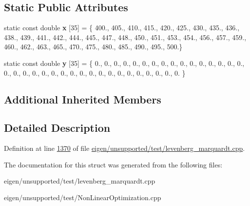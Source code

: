 \subsection*{Static Public Attributes}
\begin{DoxyCompactItemize}
\item 
\mbox{\label{structeckerle4__functor_ad42bef72c75b2b8e2c8e2c0f77bd54ed}} 
static const double {\bfseries x} \mbox{[}35\mbox{]} = \{ 400., 405., 410., 415., 420., 425., 430., 435., 436., 438., 439., 441., 442., 444., 445., 447., 448., 450., 451., 453., 454., 456., 457., 459., 460., 462., 463., 465., 470., 475., 480., 485., 490., 495., 500.\}
\item 
\mbox{\label{structeckerle4__functor_ac3b38ab6cd0b6aa294acd137e1f564df}} 
static const double {\bfseries y} \mbox{[}35\mbox{]} = \{ 0., 0., 0., 0., 0., 0., 0., 0., 0., 0., 0., 0., 0., 0., 0., 0., 0., 0., 0., 0., 0., 0., 0., 0., 0., 0., 0., 0., 0., 0., 0., 0., 0., 0., 0. \}
\end{DoxyCompactItemize}
\subsection*{Additional Inherited Members}


\subsection{Detailed Description}


Definition at line \hyperlink{eigen_2unsupported_2test_2levenberg__marquardt_8cpp_source_l01370}{1370} of file \hyperlink{eigen_2unsupported_2test_2levenberg__marquardt_8cpp_source}{eigen/unsupported/test/levenberg\+\_\+marquardt.\+cpp}.



The documentation for this struct was generated from the following files\+:\begin{DoxyCompactItemize}
\item 
eigen/unsupported/test/levenberg\+\_\+marquardt.\+cpp\item 
eigen/unsupported/test/\+Non\+Linear\+Optimization.\+cpp\end{DoxyCompactItemize}
